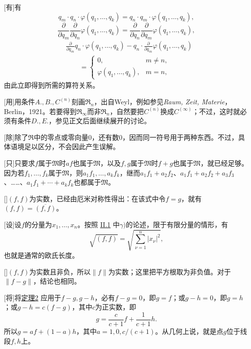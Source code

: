 \documentclass[fontsize=13pt,twoside,openany,headings=normal,parskip=false,bookmarkpackage=false,DIV=calc]{scrbook}
\begin{document}
[有]{有
\[
q_m\cdot q_n\cdot\varphi(q_1,\ldots,q_k)=q_n\cdot q_m\cdot\varphi(q_1,\ldots,q_k),
\]
\[
\frac{\partial}{\partial q_m}\frac{\partial}{\partial q_n}\varphi(q_1,\ldots,q_k)
=\frac{\partial}{\partial q_n}\frac{\partial}{\partial q_m}\varphi(q_1,\ldots,q_k),
\]
\begin{align*}
&\frac{\partial}{\partial q_m}q_n\cdot\varphi(q_1,\ldots,q_k)
-q_n\cdot\frac{\partial}{\partial q_m}\varphi(q_1,\ldots,q_k)\\
&\qquad=\begin{cases}0,&m\ne n,\\\varphi(q_1,\ldots,q_k),&m=n,\end{cases}
\end{align*}
由此立即得到所需的算符关系。}

[用]{用条件$\hyperref[ax:II.A]{A}.,\allowbreak \hyperref[ax:II.B]{B}.,\allowbreak \hyperref[ax:II.Cn]{C^{(n)}}$刻画$\mathfrak R_n$，出自Weyl，例如参见\emph{Raum, Zeit, Materie}，Berlin，1921。若要得到$\mathfrak R_\infty$而非$\mathfrak R_n$，自然要把\hyperref[ax:II.Cn]{$C^{(n)}$}换成\hyperref[ax:II.Cinfty]{$C^{(\infty)}$}；不过，这时就必须有条件$\hyperref[ax:II.D]{D}.,\allowbreak \hyperref[ax:II.E]{E}.$，参见正文后面继续展开的讨论。}

[除]{除了$\mathfrak R$中的零点或零向量$0$，还有数$0$，因而同一符号用于两种东西。不过，具体语境足以区分，不会因此产生误解。}

[只]{只要求$f$属于$\mathfrak M$时$af$也属于$\mathfrak M$，以及$f,\allowbreak g$属于$\mathfrak M$时$f+g$也属于$\mathfrak M$，就已经足够。因为若$f_1,\allowbreak \ldots,\allowbreak f_k$属于$\mathfrak M$，则$a_1f_1,\allowbreak \ldots,\allowbreak a_kf_k$，继而$a_1f_1+a_2f_2$、$a_1f_1+a_2f_2+a_3f_3$、……、$a_1f_1+\cdots+a_kf_k$也都属于$\mathfrak M$。}

[]{$(f,\allowbreak f)$为实数，已经由厄米对称性得出：在该式中令$f=g$，就有$(f,\allowbreak f)=\overline{(f,\allowbreak f)}$。}

[设]{设$f$的分量为$x_1,\allowbreak \ldots,\allowbreak x_n$。按照 \hyperref[sec:II.1]{II.1} 中$\gamma)$的论述，限于有限分量的情形，有
\[
\sqrt{(f,f)}=\sqrt{\sum_{\nu=1}^{n}|x_\nu|^2},
\]
也就是通常的欧氏长度。}

[]{$(f,\allowbreak f)$为实数且非负，所以$\lVert f\rVert$为实数；这里把平方根取为非负值。对于$\lVert f-g\rVert$，结论也相同。}

[将]{将\CJKglue \hyperref[thm:II.2]{定理2} 应用于$f-g,\allowbreak g-h$，必有$f-g=0$，即$g=f$；或$g-h=0$，即$g=h$；或$g-h=c(f-g)$，其中$c$为正实数，即
\[
g=\frac{c}{c+1}f+\frac1{c+1}h.
\]
所以$g=af+(1-a)h$，其中$a=1,\allowbreak 0,\allowbreak c/(c+1)$。从几何上说，就是点$g$位于线段$f,\allowbreak h$上。}
\end{document}
